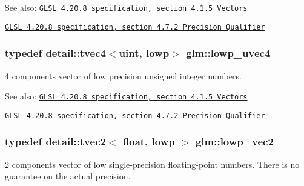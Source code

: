 \begin{Desc}
\item[See also:]\href{http://www.opengl.org/registry/doc/GLSLangSpec.4.20.8.pdf}{\tt GLSL 4.20.8 specification, section 4.1.5 Vectors} 

\href{http://www.opengl.org/registry/doc/GLSLangSpec.4.20.8.pdf}{\tt GLSL 4.20.8 specification, section 4.7.2 Precision Qualifier} \end{Desc}
\hypertarget{group__core__precision_g17b5f652e5c64b0034065420d844fca7}{
\subsubsection[lowp\_\-uvec4]{\setlength{\rightskip}{0pt plus 5cm}typedef detail::tvec4$<$uint, lowp$>$ {\bf glm::lowp\_\-uvec4}}}
\label{group__core__precision_g17b5f652e5c64b0034065420d844fca7}


4 components vector of low precision unsigned integer numbers.

\begin{Desc}
\item[See also:]\href{http://www.opengl.org/registry/doc/GLSLangSpec.4.20.8.pdf}{\tt GLSL 4.20.8 specification, section 4.1.5 Vectors} 

\href{http://www.opengl.org/registry/doc/GLSLangSpec.4.20.8.pdf}{\tt GLSL 4.20.8 specification, section 4.7.2 Precision Qualifier} \end{Desc}
\hypertarget{group__core__precision_gc63d79532b7e8d18f579ebe63e4fde49}{
\subsubsection[lowp\_\-vec2]{\setlength{\rightskip}{0pt plus 5cm}typedef detail::tvec2$<$ float, lowp $>$ {\bf glm::lowp\_\-vec2}}}
\label{group__core__precision_gc63d79532b7e8d18f579ebe63e4fde49}


2 components vector of low single-precision floating-point numbers. There is no guarantee on the actual precision.

